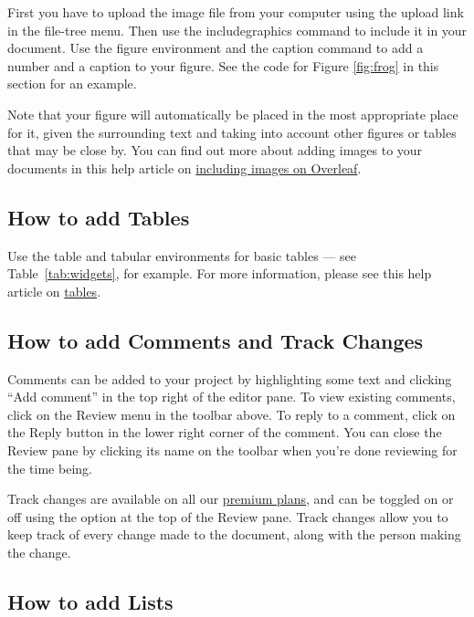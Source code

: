 \documentclass{article}
\begin{document}
First you have to upload the image file from your computer using the upload link in the file-tree menu. Then use the includegraphics command to include it in your document. Use the figure environment and the caption command to add a number and a caption to your figure. See the code for Figure \ref{fig:frog} in this section for an example.

Note that your figure will automatically be placed in the most appropriate place for it, given the surrounding text and taking into account other figures or tables that may be close by. You can find out more about adding images to your documents in this help article on \href{https://www.overleaf.com/learn/how-to/Including_images_on_Overleaf}{including images on Overleaf}.



\subsection{How to add Tables}

Use the table and tabular environments for basic tables --- see Table~\ref{tab:widgets}, for example. For more information, please see this help article on \href{https://www.overleaf.com/learn/latex/tables}{tables}.



\subsection{How to add Comments and Track Changes}

Comments can be added to your project by highlighting some text and clicking ``Add comment'' in the top right of the editor pane. To view existing comments, click on the Review menu in the toolbar above. To reply to a comment, click on the Reply button in the lower right corner of the comment. You can close the Review pane by clicking its name on the toolbar when you're done reviewing for the time being.

Track changes are available on all our \href{https://www.overleaf.com/user/subscription/plans}{premium plans}, and can be toggled on or off using the option at the top of the Review pane. Track changes allow you to keep track of every change made to the document, along with the person making the change.

\subsection{How to add Lists}
\end{document}
